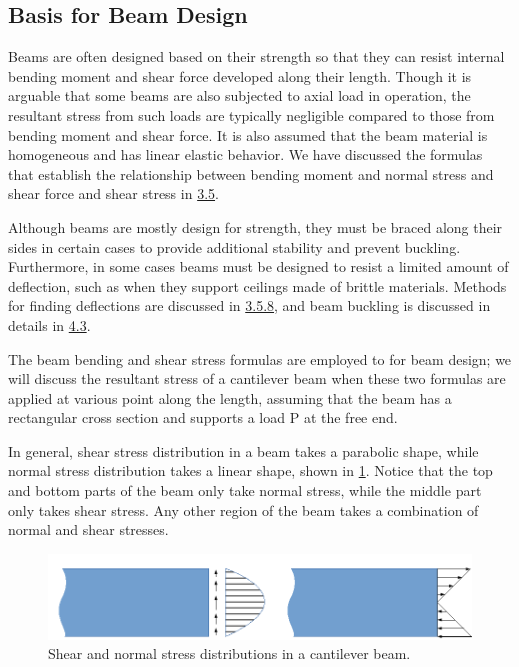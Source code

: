 \documentclass[a4paper,openany,nobib]{tufte-book}
\begin{document}
{{\subsection{Basis for Beam Design}
\label{basis-for-beam-design}
Beams are often designed based on their strength so that they can resist
internal bending moment and shear force developed along their length.
Though it is arguable that some beams are also subjected to axial load
in operation, the resultant stress from such loads are typically
negligible compared to those from bending moment and shear force. It is
also assumed that the beam material is homogeneous and has linear
elastic behavior. We have discussed the formulas that establish the
relationship between bending moment and normal stress and shear force
and shear stress in \hyperref[section: bending]{3.5}.

Although beams are mostly design for strength, they must be braced along
their sides in certain cases to provide additional stability and prevent
buckling. Furthermore, in some cases beams must be designed to resist a
limited amount of deflection, such as when they support ceilings made of
brittle materials. Methods for finding deflections are discussed in
\hyperref[subsection: beam deflection]{3.5.8}, and beam buckling is discussed
in details in \hyperref[section: buckling]{4.3}.

The beam bending and shear stress formulas are employed to for beam
design; we will discuss the resultant stress of a cantilever beam when
these two formulas are applied at various point along the length,
assuming that the beam has a rectangular cross section and supports a
load P at the free end.

In general, shear stress distribution in a beam takes a parabolic shape,
while normal stress distribution takes a linear shape, shown in
\ref{fig: stress in beam}. Notice that the top and
bottom parts of the beam only take normal stress, while the middle part
only takes shear stress. Any other region of the beam takes a
combination of normal and shear stresses.


\begin{figure}[htbp]
\centering
\includegraphics[width=.9\linewidth]{pictures/Simple-load-bearing/stress-in-beam.pdf}
\caption{\label{fig: stress in beam}Shear and normal stress distributions in a cantilever beam.}
\end{figure}

}}
\end{document}
